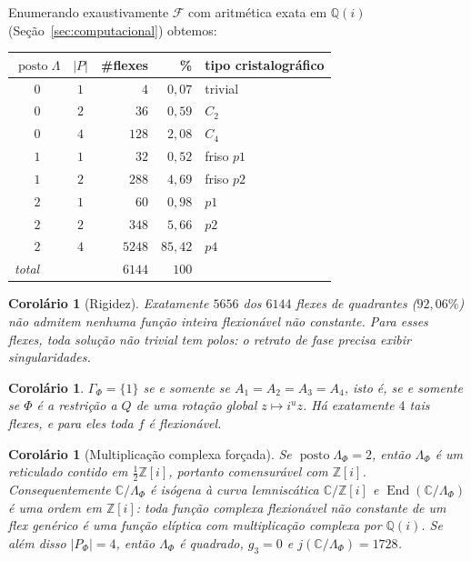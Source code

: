 \documentclass[11pt,a4paper]{article}
\theoremstyle{plain}
\newtheorem{corolario}[teorema]{Corolário}
\theoremstyle{definition}
\theoremstyle{remark}
\newcommand{\C}{\mathbb{C}}
\newcommand{\Z}{\mathbb{Z}}
\newcommand{\Q}{\mathbb{Q}}
\newcommand{\Zi}{\Z[i]}
\newcommand{\FF}{\mathscr{F}}
\DeclareMathOperator{\End}{End}
\begin{document}
Enumerando exaustivamente $\FF$ com aritmética exata em $\Q(i)$
(Seção~\ref{sec:computacional}) obtemos:

\begin{center}
\renewcommand{\arraystretch}{1.2}
\begin{tabular}{ccrrl}
\toprule
$\operatorname{posto}\Lambda$ & $|P|$ & \#flexes & \% & tipo cristalográfico\\
\midrule
$0$ & $1$ & $4$    & $0{,}07$  & trivial\\
$0$ & $2$ & $36$   & $0{,}59$  & $C_2$\\
$0$ & $4$ & $128$  & $2{,}08$  & $C_4$\\
$1$ & $1$ & $32$   & $0{,}52$  & friso $p1$\\
$1$ & $2$ & $288$  & $4{,}69$  & friso $p2$\\
$2$ & $1$ & $60$   & $0{,}98$  & $p1$\\
$2$ & $2$ & $348$  & $5{,}66$  & $p2$\\
$2$ & $4$ & $5248$ & $85{,}42$ & $p4$\\
\midrule
\multicolumn{2}{l}{\emph{total}} & $6144$ & $100$ & \\
\bottomrule
\end{tabular}
\end{center}

\begin{corolario}[Rigidez]\label{cor:rigidez}
Exatamente $5656$ dos $6144$ flexes de quadrantes ($92{,}06\%$) não admitem
nenhuma função inteira flexionável não constante. Para esses flexes, toda
solução não trivial \emph{tem polos}: o retrato de fase precisa exibir
singularidades.
\end{corolario}

\begin{corolario}\label{cor:trivial}
$\Gamma_\Phi=\{1\}$ se e somente se $A_1=A_2=A_3=A_4$, isto é, se e somente se
$\Phi$ é a restrição a $Q$ de uma rotação global $z\mapsto i^u z$. Há
exatamente $4$ tais flexes, e para eles toda $f$ é flexionável.
\end{corolario}

\begin{corolario}[Multiplicação complexa forçada]\label{cor:cm}
Se $\operatorname{posto}\Lambda_\Phi=2$, então $\Lambda_\Phi$ é um reticulado
contido em $\frac12\Zi$, portanto comensurável com $\Zi$. Consequentemente
$\C/\Lambda_\Phi$ é isógena à curva lemniscática $\C/\Zi$ e
$\End(\C/\Lambda_\Phi)$ é uma ordem em $\Zi$: toda função complexa flexionável
não constante de um flex genérico é uma função elíptica \emph{com multiplicação
complexa por $\Q(i)$}. Se além disso $|P_\Phi|=4$, então $\Lambda_\Phi$ é
quadrado, $g_3=0$ e $j(\C/\Lambda_\Phi)=1728$.
\end{corolario}
\end{document}
